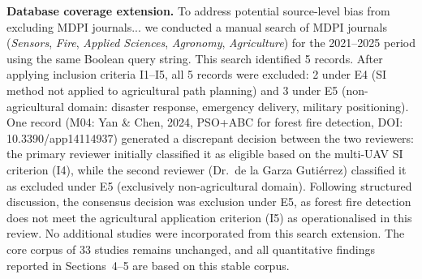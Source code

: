 \documentclass[review,3p,times]{elsarticle}
\begin{document}
\textbf{Database coverage extension.} To address potential source-level bias from excluding MDPI journals... we conducted a manual search of MDPI journals (\textit{Sensors}, \textit{Fire}, \textit{Applied Sciences}, \textit{Agronomy}, \textit{Agriculture}) for the 2021--2025 period using the same Boolean query string. This search identified 5 records. After applying inclusion criteria I1--I5, all 5 records were excluded: 2 under E4 (SI method not applied to agricultural path planning) and 3 under E5 (non-agricultural domain: disaster response, emergency delivery, military positioning). One record (M04: Yan \& Chen, 2024, PSO+ABC for forest fire detection, DOI: 10.3390/app14114937) generated a discrepant decision between the two reviewers: the primary reviewer initially classified it as eligible based on the multi-UAV SI criterion (I4), while the second reviewer (Dr.\ de la Garza Gutiérrez) classified it as excluded under E5 (exclusively non-agricultural domain). Following structured discussion, the consensus decision was exclusion under E5, as forest fire detection does not meet the agricultural application criterion (I5) as operationalised in this review. No additional studies were incorporated from this search extension. The core corpus of 33 studies remains unchanged, and all quantitative findings reported in Sections~4--5 are based on this stable corpus.
\end{document}
